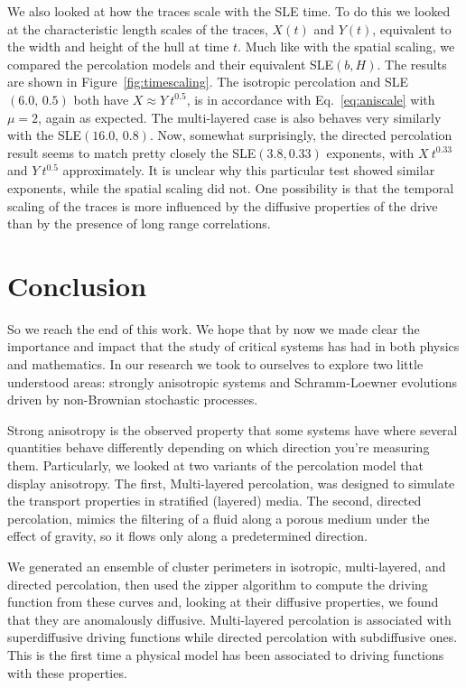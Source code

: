We also looked at how the traces scale with the SLE time. To do this we looked
at the characteristic length scales of the traces, $X(t)$ and $Y(t)$,
equivalent to the width and height of the hull at time $t$. Much like with the
spatial scaling, we compared the percolation models and their equivalent
SLE$(b,H)$. The results are shown in Figure~\ref{fig:timescaling}. The
isotropic percolation and SLE$(6.0,\, 0.5)$ both have $X\approx Y~t^{0.5}$, is
in accordance with Eq.~\ref{eq:aniscale} with $\mu=2$, again as expected. The
multi-layered case is also behaves very similarly with the SLE$(16.0,\,0.8)$.
Now, somewhat surprisingly, the directed percolation result seems to match
pretty closely the SLE$(3.8, 0.33)$ exponents, with $X~t^{0.33}$ and
$Y~t^{0.5}$ approximately. It is unclear why this particular test showed
similar exponents, while the spatial scaling did not. One possibility is that
the temporal scaling of the traces is more influenced by the diffusive
properties of the drive than by the presence of long range correlations.


\chapter{Conclusion}
\label{sec:concl}

So we reach the end of this work. We hope that by now we made clear the
importance and impact that the study of critical systems has had in both
physics and mathematics. In our research we took to ourselves to explore two
little understood areas: strongly anisotropic systems and Schramm-Loewner
evolutions driven by non-Brownian stochastic processes.

Strong anisotropy is the observed property that some systems have where several
quantities behave differently depending on which direction you're measuring
them. Particularly, we looked at two variants of the percolation model that
display anisotropy. The first, Multi-layered percolation, was designed to
simulate the transport properties in stratified (layered) media. The second,
directed percolation, mimics the filtering of a fluid along a porous medium
under the effect of gravity, so it flows only along a predetermined direction.

We generated an ensemble of cluster perimeters in isotropic, multi-layered, and
directed percolation, then used the zipper algorithm to compute the driving
function from these curves and, looking at their diffusive properties, we found
that they are anomalously diffusive. Multi-layered percolation is associated
with superdiffusive driving functions while directed percolation with
subdiffusive ones. This is the first time a physical model has been associated
to driving functions with these properties.

